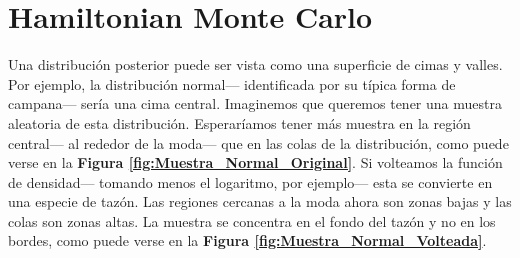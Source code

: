 \section{Hamiltonian Monte Carlo}

Una distribución posterior puede ser vista como una superficie de cimas y valles. Por ejemplo, la distribución normal--- identificada por su típica forma de campana--- sería una cima central. Imaginemos que queremos tener una muestra aleatoria de esta distribución. Esperaríamos tener más muestra en la región central--- al rededor de la moda--- que en las colas de la distribución, como puede verse en la \textbf{Figura \ref{fig:Muestra_Normal_Original}}. Si volteamos la función de densidad--- tomando menos el logaritmo, por ejemplo--- esta se convierte en una especie de tazón. Las regiones cercanas a la moda ahora son zonas bajas y las colas son zonas altas. La muestra se concentra en el fondo del tazón y no en los bordes, como puede verse en la \textbf{Figura \ref{fig:Muestra_Normal_Volteada}}.\\

